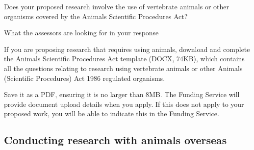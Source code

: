 \documentclass[12pt]{article}
\newenvironment{instruction}{\par\color{red}}{\par}
\begin{document}
\begin{instruction}

Does your proposed research involve the use of vertebrate animals or other
organisms covered by the Animals Scientific Procedures Act?

What the assessors are looking for in your response

If you are proposing research that requires using animals, download and
complete the Animals Scientific Procedures Act template (DOCX, 74KB),
which contains all the questions relating to research using vertebrate animals or
other Animals (Scientific Procedures) Act 1986 regulated organisms.

Save it as a PDF, ensuring it is no larger than 8MB. The Funding Service will
provide document upload details when you apply. If this does not apply to your
proposed work, you will be able to indicate this in the Funding Service.

\end{instruction}

\pagebreak
\subsection{Conducting research with animals overseas}
\end{document}
